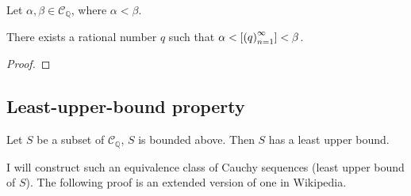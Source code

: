 \begin{theorem}
    Let $\alpha, \beta\in\mathscr{C}_{\mathbb{Q}}$, where $\alpha < \beta$.

    There exists a rational number $q$ such that $\alpha < \left[{{\left({q}\right)}^{\infty}_{n=1}}\right] < \beta$.
\end{theorem}

\begin{proof}
\end{proof}

\subsection{Least-upper-bound property}

\begin{theorem}
    Let $S$ be a subset of $\mathscr{C}_{\mathbb{Q}}$, $S$ is bounded above. Then $S$ has a least upper bound.
\end{theorem}

I will construct such an equivalence class of Cauchy sequences (least upper bound of $S$). The following proof is an extended version of one in Wikipedia.

